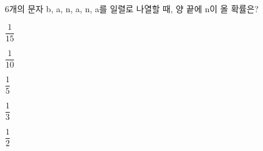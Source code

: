 $6$개의 문자 b, a, n, a, n, a를 일렬로 나열할 때, 양 끝에 n이 올 확률은?
\begin{choices32}{\rule[-3ex]{0pt}{8ex}$\dfrac{1}{15}$}{\rule[-3ex]{0pt}{8ex}$\dfrac{1}{10}$}{\rule[-3ex]{0pt}{8ex}$\dfrac{1}{5}$}{\rule[-3ex]{0pt}{8ex}$\dfrac{1}{3}$}{\rule[-3ex]{0pt}{8ex}$\dfrac{1}{2}$}\end{choices32}

